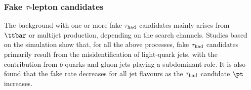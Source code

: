 


\subsubsection{Fake $\tau$-lepton candidates}
\label{sec:faketaus}
The background with one or more fake $\tau_{\mathrm{had}}$ candidates mainly arises from $\ttbar$ or
multijet production, depending on the search channels.
Studies based on the simulation show that, for all the above processes, fake $\tau_{\mathrm{had}}$ candidates primarily result from the
misidentification of light-quark jets, with the contribution from $b$-quarks and gluon jets playing a subdominant role.
It is also found that the fake rate decreases for all jet flavours as the $\tau_{\mathrm{had}}$ candidate $\pt$ increases.

